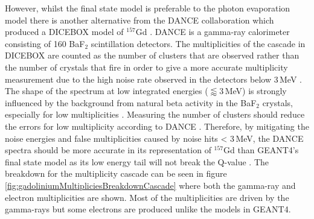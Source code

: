 
However, whilst the final state model is preferable to the photon evaporation model there is another alternative from the DANCE collaboration which produced a DICEBOX model of $^{157}$Gd \cite{Chyzh_2011}. DANCE is a gamma-ray calorimeter consisting of 160 BaF$_2$ scintillation detectors. The multiplicities of the cascade in DICEBOX are counted as the number of clusters that are observed rather than the number of crystals that fire in order to give a more accurate multiplicity measurement due to the high noise rate observed in the detectors below 3\,MeV \cite{Chyzh_2011}. The shape of the spectrum at low integrated energies ($\lessapprox 3$\,MeV) is strongly influenced by the background from natural beta activity in the BaF$_2$ crystals, especially for low multiplicities \cite{Chyzh_2011}. Measuring the number of clusters should reduce the errors for low multiplicity according to DANCE \cite{Chyzh_2011}. Therefore, by mitigating the noise energies and false multiplicities caused by noise hits < 3\,MeV, the DANCE spectra should  be more accurate in its representation of $^{157}$Gd than GEANT4's final state model as its low energy tail will not break the Q-value \cite{YuChen_2015}. The breakdown for the multiplicity cascade can be seen in figure \ref{fig:gadoliniumMultipliciesBreakdownCascade} where both the gamma-ray and electron multiplicities are shown. Most of the multiplicities are driven by the gamma-rays but some electrons are produced unlike the models in GEANT4. 
